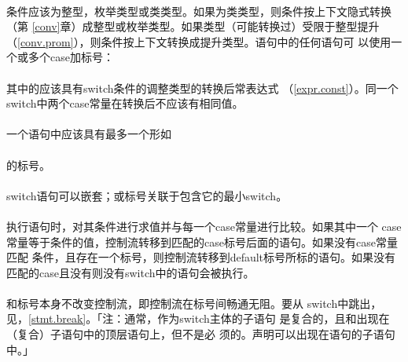 \paragraph{}
条件应该为整型，枚举类型或类类型。如果为类类型，则条件按上下文隐式转换（第
\ref{conv}章）成整型或枚举类型。如果类型（可能转换过）受限于整型提升
（\ref{conv.prom}），则条件按上下文转换成提升类型。语句中的任何语句可
以使用一个或多个case加标号：                                                  \\
\mbox{\qquad {}  \tm{:}}                       \\
其中的应该具有switch条件的调整类型的转换后常表达式
（\ref{expr.const}）。同一个switch中两个case常量在转换后不应该有相同值。

\paragraph{}
一个语句中应该具有最多一个形如                                     \\
\mbox{\qquad {}}                                                  \\
的标号。

\paragraph{}
switch语句可以嵌套；或标号关联于包含它的最小switch。

\paragraph{}
执行语句时，对其条件进行求值并与每一个case常量进行比较。如果其中一个
case常量等于条件的值，控制流转移到匹配的case标号后面的语句。如果没有case常量匹配
条件，且存在一个标号，则控制流转移到default标号所标的语句。如果没有
匹配的case且没有则没有switch中的语句会被执行。

\paragraph{}
和标号本身不改变控制流，即控制流在标号间畅通无阻。要从
switch中跳出，见，\ref{stmt.break}。「注：通常，作为switch主体的子语句
是复合的，且和出现在（复合）子语句中的顶层语句上，但不是必
须的。声明可以出现在语句的子语句中。」


